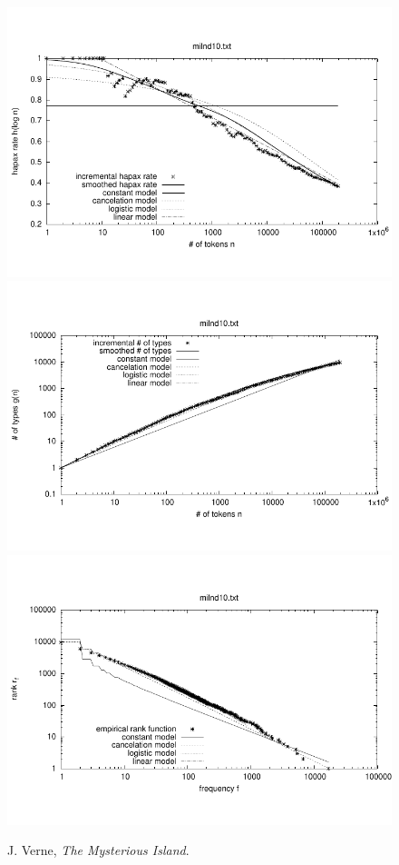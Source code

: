 \documentclass[a4paper,12pt]{article}
\begin{document}

\begin{figure}[p]
  \centering
  \vspace{-2em}
  \includegraphics[width=0.8\columnwidth]{output/herdan/milnd10_27/token_ratio.pdf}
  \\[-3em]
  \includegraphics[width=0.8\columnwidth]{output/herdan/milnd10_27/token_type.pdf}
  \\[-3em]
  \includegraphics[width=0.8\columnwidth]{output/herdan/milnd10_27/frequency_rank.pdf}
  \vspace{-2em}
  \caption{J. Verne, \emph{The Mysterious Island}.\label{figmilnd10F}}
\end{figure}
\end{document}
